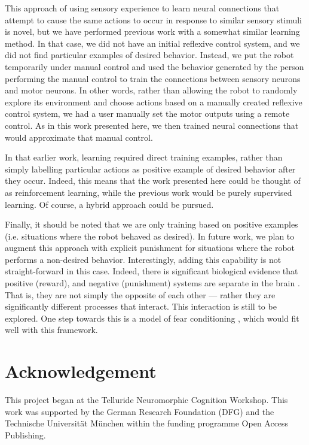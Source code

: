 \documentclass{frontiersSCNS}
\begin{document}
This approach of using sensory experience to learn neural connections
that attempt to cause the same actions to occur in response to similar
sensory stimuli is novel, but we have performed previous work \citep{conradt2014trainable}
with a somewhat similar learning method. In that case, we did not have an 
initial reflexive control system, and we did not find particular examples of 
desired behavior. Instead, we put the robot temporarily under manual control 
and used the behavior generated by the person performing the manual control 
to train the connections between sensory neurons and motor neurons.  In other
words, rather than allowing the robot to randomly explore its environment and
choose actions based on a manually created reflexive control system, we had
a user manually set the motor outputs using a remote control.  As in this work
presented here, we then trained neural connections that would approximate that
manual control.  

In that earlier work, learning required direct training examples, rather than 
simply labelling particular actions as positive example of desired behavior 
after they occur.  Indeed, this means that the work presented here could be 
thought of as reinforcement learning, while the previous work would be purely 
supervised learning. Of course, a hybrid approach could be pursued. 

Finally, it should be noted that we are only training based on positive 
examples (i.e. situations where the robot behaved as desired). In future work,
we plan to augment this approach with explicit punishment for situations where 
the robot performs a non-desired behavior. Interestingly, adding this capability
is not straight-forward in this case.  Indeed, there is significant biological 
evidence that positive (reward), and negative (punishment) systems are separate 
in the brain \citep{boureau2010}. That is, they are not simply the opposite of 
each other --- rather they are significantly different processes that interact. 
This interaction is still to be explored. One step towards this is a model
of fear conditioning \citep	{kolbeck2013fear}, which would fit well with this framework.


\section*{Acknowledgement}

This project began at the Telluride Neuromorphic Cognition Workshop. 
This work was supported by the German Research Foundation (DFG) and the 
Technische Universit{\"a}t M{\"u}nchen within the funding programme Open Access Publishing.




\end{document}
